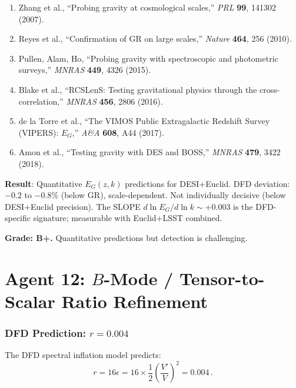 \documentclass[11pt,a4paper]{article}
\begin{document}
\begin{enumerate}
\item Zhang et al., ``Probing gravity at cosmological scales,'' \textit{PRL} \textbf{99}, 141302 (2007).
\item Reyes et al., ``Confirmation of GR on large scales,'' \textit{Nature} \textbf{464}, 256 (2010).
\item Pullen, Alam, Ho, ``Probing gravity with spectroscopic and photometric surveys,'' \textit{MNRAS} \textbf{449}, 4326 (2015).
\item Blake et al., ``RCSLenS: Testing gravitational physics through the cross-correlation,'' \textit{MNRAS} \textbf{456}, 2806 (2016).
\item de la Torre et al., ``The VIMOS Public Extragalactic Redshift Survey (VIPERS): $E_G$,'' \textit{A\&A} \textbf{608}, A44 (2017).
\item Amon et al., ``Testing gravity with DES and BOSS,'' \textit{MNRAS} \textbf{479}, 3422 (2018).
\end{enumerate}

\begin{tcolorbox}[colback=green!5!white, colframe=green!60!black, title={Agent 11: $E_G$ Predictions --- COMPLETE}]
\textbf{Result}: Quantitative $E_G(z,k)$ predictions for DESI+Euclid. DFD deviation: $-0.2$ to $-0.8\%$ (below GR), scale-dependent. Not individually decisive (below DESI+Euclid precision). The SLOPE $d\ln E_G/d\ln k \sim +0.003$ is the DFD-specific signature; measurable with Euclid+LSST combined.

\textbf{Grade: B+.} Quantitative predictions but detection is challenging.
\end{tcolorbox}


\part{Agent 12: $B$-Mode / Tensor-to-Scalar Ratio Refinement}
\label{part:bmode}

\section{DFD Prediction: $r = 0.004$}

The DFD spectral inflation model predicts:
\begin{equation}
r = 16\epsilon = 16\times\frac{1}{2}\left(\frac{V'}{V}\right)^2 = 0.004\,.
\end{equation}
\end{document}
